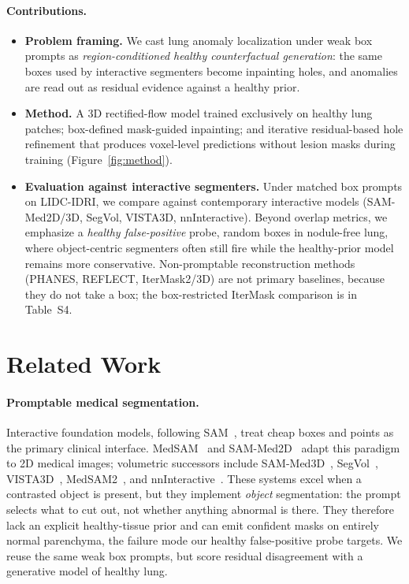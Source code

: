 \documentclass[twoside]{article}
\newcommand{\suppTabUnprompted}{Table~S4}
\begin{document}
\paragraph{Contributions.}
\begin{itemize}
\item \textbf{Problem framing.}
    We cast lung anomaly localization under weak box prompts as
    \emph{region-conditioned healthy counterfactual generation}: the same
    boxes used by interactive segmenters become inpainting holes, and
    anomalies are read out as residual evidence against a healthy prior.

\item \textbf{Method.}
    A 3D rectified-flow model trained exclusively on healthy lung patches;
    box-defined mask-guided inpainting; and iterative residual-based hole
    refinement that produces voxel-level predictions without lesion masks
    during training (Figure~\ref{fig:method}).

\item \textbf{Evaluation against interactive segmenters.}
    Under matched box prompts on LIDC-IDRI, we compare against
    contemporary interactive models (SAM-Med2D/3D, SegVol, VISTA3D,
    nnInteractive). Beyond overlap metrics, we emphasize a
    \emph{healthy false-positive} probe, random boxes in nodule-free
    lung, where object-centric segmenters often still fire while the
    healthy-prior model remains more conservative.
    Non-promptable reconstruction methods (PHANES, REFLECT, IterMask2/3D)
    are not primary baselines, because they do not take a box;
    the box-restricted IterMask comparison is in \suppTabUnprompted{}.
\end{itemize}

\section{Related Work}
\label{sec:related}

\paragraph{Promptable medical segmentation.}
Interactive foundation models, following SAM~\citep{kirillov2023sam},
treat cheap boxes and points as the primary clinical interface.
MedSAM~\citep{medsam2024} and SAM-Med2D~\citep{sam_med2d2023} adapt
this paradigm to 2D medical images; volumetric successors include
SAM-Med3D~\citep{sam_med3d2023}, SegVol~\citep{segvol2024},
VISTA3D~\citep{vista3d2024}, MedSAM2~\citep{medsam2_2025}, and
nnInteractive~\citep{nninteractive2025}.
These systems excel when a contrasted object is present, but they
implement \emph{object} segmentation: the prompt selects what to cut
out, not whether anything abnormal is there.
They therefore lack an explicit healthy-tissue prior and can emit
confident masks on entirely normal parenchyma, the failure mode our
healthy false-positive probe targets.
We reuse the same weak box prompts, but score residual disagreement
with a generative model of healthy lung.
\end{document}
